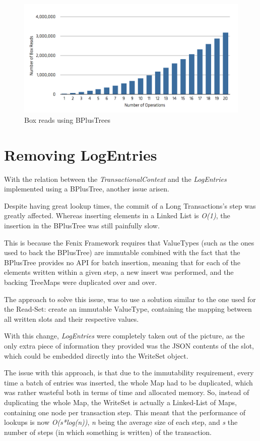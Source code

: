 \begin{figure}
\centering
\includegraphics[width=0.9\linewidth]{box-long-bplus}
\caption{Box reads using BPlusTrees}
\label{fig:boxesBPlus}
\end{figure}


\section{Removing LogEntries}

With the relation between the {\it TransactionalContext} and the {\it
  LogEntries} implemented using a BPlusTree, another issue arisen. 

Despite having great lookup times, the commit of a Long Transactions's
step was greatly affected. Whereas inserting elements in a Linked List
is {\it O(1)}, the insertion in the BPlusTree was still painfully
slow.

This is because the Fenix Framework requires that ValueTypes (such as
the ones used to back the BPlusTree) are immutable combined with the
fact that the BPlusTree provides no API for batch insertion, meaning
that for each of the elements written within a given step, a new
insert was performed, and the backing TreeMaps were duplicated over
and over. 

The approach to solve this issue, was to use a solution similar to the
one used for the Read-Set: create an immutable ValueType, containing
the mapping between all written slots and their respective values.

With this change, {\it LogEntries} were completely taken out of the
picture, as the only extra piece of information they provided was the
JSON contents of the slot, which could be embedded directly into the
WriteSet object.

The issue with this approach, is that due to the immutability
requirement, every time a batch of entries was inserted, the whole Map
had to be duplicated, which was rather wasteful both in terms of time
and allocated memory. So, instead of duplicating the whole Map, the
WriteSet is actually a Linked-List of Maps, containing one node per
transaction step. This meant that the performance of lookups is now
{\it O(s*log(n))}, {\it n} being the average size of each step, and
{\it s} the number of steps (in which something is written) of the
transaction.

